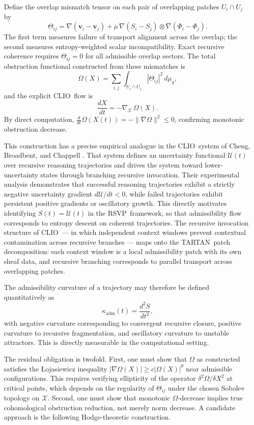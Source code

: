 \documentclass[12pt,a4paper]{article}
\newcommand{\RSVP}{\textrm{RSVP}}
\newcommand{\CLIO}{\textrm{CLIO}}
\newcommand{\TARTAN}{\textrm{TARTAN}}
\newcommand{\Field}{\mathcal{X}}
\begin{document}
Define the overlap mismatch tensor on each pair of overlapping patches
$U_i\cap U_j$ by
\[
\Theta_{ij}
= \nabla(\mathbf{v}_i-\mathbf{v}_j)
+ \mu\,\nabla(S_i-S_j)\otimes\nabla(\Phi_i-\Phi_j).
\]
The first term measures failure of transport alignment across the overlap; the
second measures entropy-weighted scalar incompatibility. Exact recursive
coherence requires $\Theta_{ij}=0$ for all admissible overlap sectors. The
total obstruction functional constructed from these mismatches is
\[
\Omega(X) = \sum_{i,j}\int_{U_i\cap U_j}|\Theta_{ij}|^2\,d\mu_g,
\]
and the explicit \CLIO\ flow is
\[
\frac{dX}{dt} = -\nabla_\Field\,\Omega(X).
\]
By direct computation, $\frac{d}{dt}\Omega(X(t))=-\|\nabla\Omega\|^2\leq 0$,
confirming monotonic obstruction decrease.

This construction has a precise empirical analogue in the \CLIO\ system of
Cheng, Broadbent, and Chappell \cite{Cheng2025}. That system defines an
uncertainty functional $\mathcal{U}(t)$ over recursive reasoning trajectories
and drives the system toward lower-uncertainty states through branching
recursive invocation. Their experimental analysis demonstrates that successful
reasoning trajectories exhibit a strictly negative uncertainty gradient
$d\mathcal{U}/dt<0$, while failed trajectories exhibit persistent positive
gradients or oscillatory growth. This directly motivates identifying
$S(t)=\mathcal{U}(t)$ in the \RSVP\ framework, so that admissibility flow
corresponds to entropy descent on coherent trajectories. The recursive
invocation structure of \CLIO\ --- in which independent context windows prevent
contextual contamination across recursive branches --- maps onto the \TARTAN\ patch
decomposition: each context window is a local admissibility patch with its own
sheaf data, and recursive branching corresponds to parallel transport across
overlapping patches.

The admissibility curvature of a trajectory may therefore be defined
quantitatively as
\[
\kappa_\mathrm{adm}(t) = \frac{d^2S}{dt^2},
\]
with negative curvature corresponding to convergent recursive closure, positive
curvature to recursive fragmentation, and oscillatory curvature to unstable
attractors. This is directly measurable in the computational setting.

The residual obligation is twofold. First, one must show that $\Omega$ as
constructed satisfies the Łojasiewicz inequality
$|\nabla\Omega(X)|\geq c|\Omega(X)|^\theta$ near admissible configurations.
This requires verifying ellipticity of the operator
$\delta^2\Omega/\delta X^2$ at critical points, which depends on the regularity
of $\Theta_{ij}$ under the chosen Sobolev topology on $\Field$. Second, one
must show that monotonic $\Omega$-decrease implies true cohomological
obstruction reduction, not merely norm decrease. A candidate approach is the
following Hodge-theoretic construction.
\end{document}
